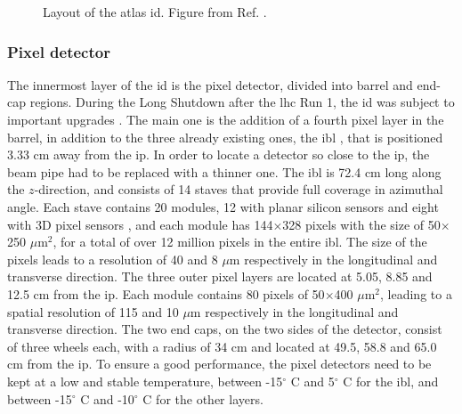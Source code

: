 \begin{figure}[ht]
\centering
{}
\caption{Layout of the \gls{atlas} \gls{id}. Figure from Ref. \cite{Potamianos:2016ptf}.}
\label{fig:atlas:id}
\end{figure}


\subsubsection*{Pixel detector}
\label{sec:atlas:pixel}
The innermost layer of the \gls{id} is the pixel detector, divided into barrel and end-cap regions. 
During the Long Shutdown after the \gls{lhc} Run 1, the \gls{id} was subject to important upgrades \cite{Potamianos:2016ptf}. 
The main one is the addition of a fourth pixel layer in the barrel, in addition to the three already existing ones, 
the \gls{ibl} \cite{Capeans:1291633}, that is positioned 3.33 cm away from the \gls{ip}. 
In order to locate a detector so close to the \gls{ip}, the beam pipe had to be replaced with a thinner one. 
The \gls{ibl} is 72.4 cm long along the $z$-direction, and consists of 14 staves that provide full coverage in azimuthal angle. Each stave contains 20 modules, 12 with planar silicon sensors and eight with 3D pixel sensors \cite{1748-0221-7-11-P11010}, and each module has 144$\times$328 pixels with the size of 50$\times$250 $\mu$m$^2$, for a total of over 12 million pixels in the entire \gls{ibl}. The size of the pixels leads to a resolution of 40 and 8 $\mu$m respectively in the longitudinal and transverse direction. 
The three outer pixel layers are located at 5.05, 8.85 and 12.5 cm from the \gls{ip}. 
Each module contains 80 pixels of 50$\times$400 $\mu$m$^2$, leading to a spatial resolution of 115 and 10 $\mu$m respectively in the longitudinal and transverse direction. 
The two end caps, on the two sides of the detector, consist of three wheels each, with a radius of 34 cm and located at 49.5, 58.8 and 65.0 cm from the \gls{ip}. 
To ensure a good performance, the pixel detectors need to be kept at a low and stable temperature, 
between -15$^{\circ}$ C and 5$^{\circ}$ C for the \gls{ibl}, and between -15$^{\circ}$ C and -10$^{\circ}$ C for the other layers.

